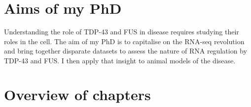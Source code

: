 %
%
%
%
%
%
%



\section{Aims of my PhD} 



Understanding the role of TDP-43 and FUS in disease requires studying their roles in the cell. 
The aim of my PhD is to capitalise on the RNA-seq revolution and bring together disparate datasets to assess the nature of RNA regulation by TDP-43 and FUS.
I then apply that insight to animal models of the disease.


\section{Overview of chapters}

